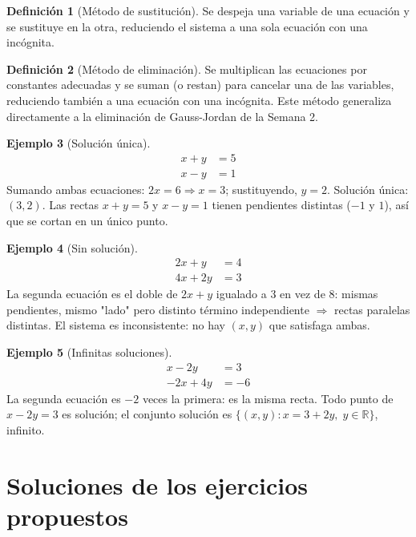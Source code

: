 \documentclass[11pt,letterpaper]{article}
\theoremstyle{definition}
\newtheorem{definicion}{Definición}[section]
\newtheorem{ejemplo}[definicion]{Ejemplo}
\newcommand{\R}{\mathbb{R}}
\begin{document}
\begin{definicion}[Método de sustitución]
Se despeja una variable de una ecuación y se sustituye en la otra, reduciendo el sistema a una
sola ecuación con una incógnita.
\end{definicion}

\begin{definicion}[Método de eliminación]
Se multiplican las ecuaciones por constantes adecuadas y se suman (o restan) para cancelar una de
las variables, reduciendo también a una ecuación con una incógnita. Este método generaliza
directamente a la eliminación de Gauss-Jordan de la Semana 2.
\end{definicion}

\begin{ejemplo}[Solución única]
\[
\begin{aligned}
  x + y &= 5 \\
  x - y &= 1
\end{aligned}
\]
Sumando ambas ecuaciones: $2x = 6 \Rightarrow x=3$; sustituyendo, $y=2$. Solución única: $(3,2)$.
Las rectas $x+y=5$ y $x-y=1$ tienen pendientes distintas ($-1$ y $1$), así que se cortan en un
único punto.
\end{ejemplo}

\begin{ejemplo}[Sin solución]
\[
\begin{aligned}
  2x + y &= 4 \\
  4x + 2y &= 3
\end{aligned}
\]
La segunda ecuación es el doble de $2x+y$ igualado a $3$ en vez de $8$: mismas pendientes, mismo
"lado" pero distinto término independiente $\Rightarrow$ rectas paralelas distintas. El sistema
es inconsistente: no hay $(x,y)$ que satisfaga ambas.
\end{ejemplo}

\begin{ejemplo}[Infinitas soluciones]
\[
\begin{aligned}
  x - 2y &= 3 \\
  -2x + 4y &= -6
\end{aligned}
\]
La segunda ecuación es $-2$ veces la primera: es la misma recta. Todo punto de $x-2y=3$ es
solución; el conjunto solución es $\{(x,y) : x = 3+2y,\; y\in\R\}$, infinito.
\end{ejemplo}


\section{Soluciones de los ejercicios propuestos}
\end{document}
